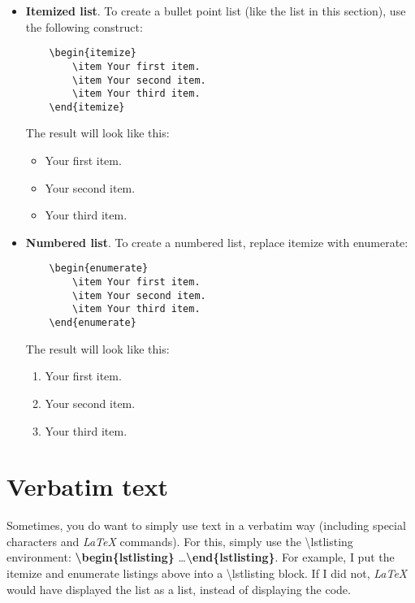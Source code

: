 \begin{itemize}
    \item \textbf{Itemized list}. To create a bullet point list (like the list in this section), use the following construct:%
    \begin{lstlisting}
    \begin{itemize}
    	\item Your first item.
    	\item Your second item.
    	\item Your third item.
    \end{itemize}
    \end{lstlisting}
    
    The result will look like this:%
    \begin{itemize}
    	\item Your first item.
    	\item Your second item.
    	\item Your third item.
    \end{itemize}
    
    \item \textbf{Numbered list}. To create a numbered list, replace itemize with enumerate:%
    \begin{lstlisting}
    \begin{enumerate}
    	\item Your first item.
    	\item Your second item.
    	\item Your third item.
    \end{enumerate}
    \end{lstlisting}
    
    The result will look like this:%
    \begin{enumerate}
    	\item Your first item.
    	\item Your second item.
    	\item Your third item.
    \end{enumerate}
\end{itemize}

\section{Verbatim text}\label{c1_verbatim:sec}

Sometimes, you do want to simply use text in a verbatim way (including special characters and \textit{LaTeX} commands). For this, simply use the \textbackslash lstlisting environment: \textbf{\textbackslash begin\{lstlisting\}} \dots \textbf{\textbackslash end\{lstlisting\}}. For example, I put the itemize and enumerate listings above into a \textbackslash lstlisting block. If I did not, \textit{LaTeX} would have displayed the list as a list, instead of displaying the code.



